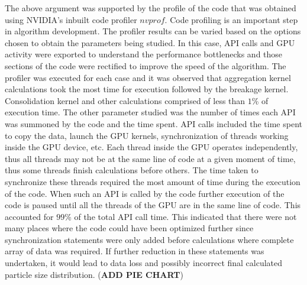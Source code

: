 \documentclass[preprint,10pt,authoryear]{elsarticle}
\begin{document}
\begin{linenumbers}
The above argument was supported by the profile of the code that was obtained using NVIDIA's
inbuilt code profiler $nvprof$. Code profiling is an important step in algorithm development. 
The profiler results can be varied based on the options chosen to obtain the parameters being 
studied. In this case, API calls and GPU activity were exported to understand the performance 
bottlenecks and those sections of the code were rectified to improve the speed of the algorithm.
The profiler was executed for each case and it was observed that aggregation kernel calculations 
took the most time for execution followed by the breakage kernel. Consolidation kernel 
and other calculations comprised of less than $1$\% of execution time. The other parameter 
studied was the number of times each API was summoned by the code and the time spent. API 
calls included the time spent to copy the data, launch the GPU kernels, synchronization of 
threads working inside the GPU device, etc. Each thread inside the GPU operates independently,
thus all threads may not be at the same line of code at a given moment of time, thus some threads 
finish calculations before others. The time taken to synchronize these threads required the most 
amount of time during the execution of the code. When such an API is called by the code 
further execution of the code is paused until all the threads of the GPU are in the same 
line of code. This accounted for $99$\% of the total API call time. This indicated that there 
were not many places where the code could have been optimized further since synchronization 
statements were only added before calculations where complete array of data was required. 
If further reduction in these statements was undertaken, it would lead to data loss and 
possibly incorrect final calculated particle size distribution. (\textbf{ADD PIE CHART})


\end{linenumbers}
\end{document}
